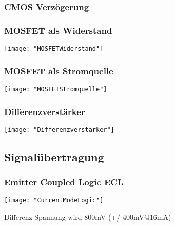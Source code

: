 \subsubsection{CMOS Verzögerung}
\begin{minipage}[t]{0.45\textwidth}
	\vspace{0pt}								%
	\subsubsection{MOSFET als Widerstand}
	\texttt{[image: "MOSFETWiderstand"]}
\end{minipage}\hspace{0.05\textwidth}
\begin{minipage}[t]{0.45\textwidth}
	\vspace{0pt}								%
	\subsubsection{MOSFET als Stromquelle}
	\texttt{[image: "MOSFETStromquelle"]}
\end{minipage}
\vspace{2mm}


\subsubsection{Differenzverstärker}
\begin{minipage}[t]{0.3\textwidth}
	\vspace{0pt}								%
	\texttt{[image: "Differenzverstärker"]}
\end{minipage}\hspace{0.05\textwidth}
\begin{minipage}[t]{0.65\textwidth}
	\vspace{0pt}								%
	
\end{minipage}
\vspace{2mm}


\subsection{Signalübertragung}
\subsubsection{Emitter Coupled Logic ECL}
\begin{minipage}[t]{0.3\textwidth}
	\vspace{0pt}								%
	\texttt{[image: "CurrentModeLogic"]}
\end{minipage}\hspace{0.05\textwidth}
\begin{minipage}[t]{0.65\textwidth}
	\vspace{0pt}								%
	Differenz-Spannung wird 800mV (+/-400mV@16mA)
\end{minipage}
\vspace{2mm}

